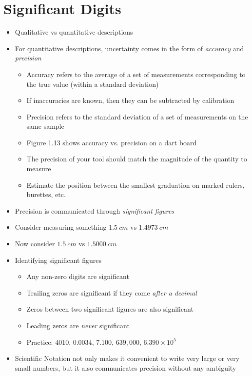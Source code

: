 \documentclass[12pt, openany, letterpaper]{memoir}
\begin{document}
\section{Significant Digits}
\begin{itemize}
	\item Qualitative vs quantitative descriptions
	\item For quantitative descriptions, uncertainty comes in the form of \emph{accuracy} and \emph{precision}
	      \begin{itemize}
		      \item Accuracy refers to the average of a set of measurements corresponding to the true value (within a standard deviation)
		      \item If inaccuracies are known, then they can be subtracted by calibration
		      \item Precision refers to the standard deviation of a set of measurements on the same sample
		      \item Figure 1.13 shows accuracy vs. precision on a dart board
		      \item The precision of your tool should match the magnitude of the quantity to measure
		      \item Estimate the position between the smallest graduation on marked rulers, burettes, etc.
	      \end{itemize}
	\item Precision is communicated through \emph{significant figures}
	\item Consider measuring something $1.5~cm$ vs $1.4973~cm$
	\item Now consider $1.5~cm$ vs $1.5000~cm$
	\item Identifying significant figures
	      \begin{itemize}
		      \item Any non-zero digits are significant
		      \item Trailing zeros are significant if they come \emph{after a decimal}
		      \item Zeros between two significant figures are also significant
		      \item Leading zeros are \emph{never} significant
		      \item Practice: $4010$, $0.0034$, $7.100$, $639,000$, $6.390\times10^{5}$
	      \end{itemize}
	\item Scientific Notation not only makes it convenient to write very large or very small numbers, but it also communicates precision without any ambiguity

\end{itemize}
\end{document}
